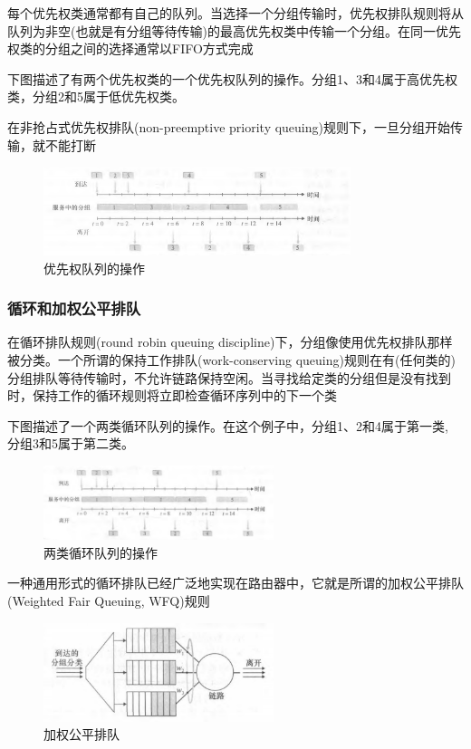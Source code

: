     每个优先权类通常都有自己的队列。当选择一个分组传输时，优先权排队规则将从队列为非空(也就是有分组等待传输)的最高优先权类中传输一个分组。在同一优先权类的分组之间的选择通常以FIFO方式完成

    下图描述了有两个优先权类的一个优先权队列的操作。分组1、3和4属于高优先权类，分组2和5属于低优先权类。

    在非抢占式优先权排队(non-preemptive priority queuing)规则下，一旦分组开始传输，就不能打断

\begin{figure}[!htbp]
    \centering
    \includegraphics[width=0.8\textwidth]{image/chapter04/优先队列的操作.png}
    \caption{优先权队列的操作}
\end{figure}

\subsubsection{循环和加权公平排队}

    在循环排队规则(round robin queuing discipline)下，分组像使用优先权排队那样被分类。一个所谓的保持工作排队(work-conserving queuing)规则在有(任何类的)分组排队等待传输时，不允许链路保持空闲。当寻找给定类的分组但是没有找到时，保持工作的循环规则将立即检查循环序列中的下一个类

    下图描述了一个两类循环队列的操作。在这个例子中，分组1、2和4属于第一类, 分组3和5属于第二类。

\begin{figure}[!htbp]
    \centering
    \includegraphics[width=0.6\textwidth]{image/chapter04/两类循环队列的操作.png}
    \caption{两类循环队列的操作}
\end{figure}

    一种通用形式的循环排队已经广泛地实现在路由器中，它就是所谓的加权公平排队(Weighted Fair Queuing, WFQ)规则

\begin{figure}[!htbp]
    \centering
    \includegraphics[width=0.6\textwidth]{image/chapter04/加权公平排队.png}
    \caption{加权公平排队}
\end{figure}

